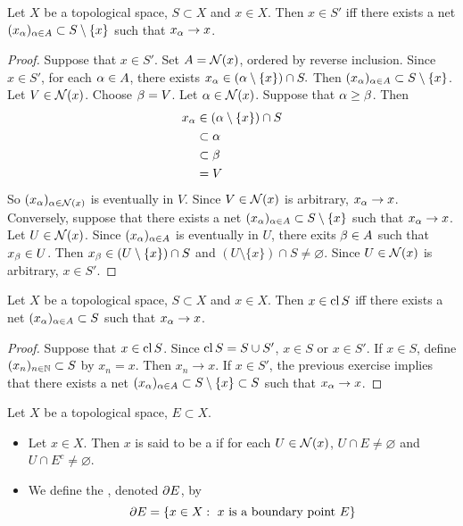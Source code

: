\documentclass{book}
\begin{document}
	\begin{ex} 
	Let $X$ be a topological space, $S \subset X$ and $x \in X$. Then $x \in S'$ iff there exists a net $(x_{\alpha})_{\alpha \in A} \subset S \setminus \{x\}$ such that $x_{\alpha} \rightarrow x$. 
	\end{ex}

	\begin{proof}
	Suppose that $x \in S'$. Set $A = \mathcal{N}(x)$, ordered by reverse inclusion.  Since $x \in S'$, for each $\alpha \in A$, there exists $x_\alpha \in (\alpha \setminus \{x\}) \cap S.$ Then $(x_{\alpha})_{\alpha \in A} \subset S \setminus \{x\}$. Let $V \in \mathcal{N}(x)$. Choose $\beta = V$. Let $\alpha \in \mathcal{N}(x)$. Suppose that $\alpha \geq \beta$. Then 
	\begin{align*}
	x_{\alpha} 
	&\in (\alpha \setminus \{x\}) \cap S \\
	& \subset \alpha \\
	& \subset \beta \\
	&= V
\end{align*}	
	So $(x_{\alpha})_{\alpha \in \mathcal{N}(x)}$ is eventually in $V$. Since $V \in \mathcal{N}(x)$ is arbitrary, $x_{\alpha } \rightarrow x$. \\
	Conversely, suppose that there exists a net $(x_{\alpha})_{\alpha \in A} \subset S \setminus \{x\}$ such that $x_{\alpha} \rightarrow x$. Let $U \in \mathcal{N}(x)$. Since $(x_{\alpha})_{\alpha \in A}$ is eventually in $U$, there exits $\beta \in A$ such that $x_{\beta} \in U$. Then $x_{\beta} \in (U \setminus \{x\}) \cap S$ and $(U \setminus \{x\}) \cap S \neq \varnothing$. Since $U \in \mathcal{N}(x)$ is arbitrary, $x \in S'$.
	\end{proof}
	
	\begin{ex} 
	Let $X$ be a topological space, $S \subset X$ and $x \in X$. Then $x \in \operatorname{cl} S$ iff there exists a net $(x_{\alpha})_{\alpha \in A} \subset S$ such that $x_{\alpha} \rightarrow x$. 
	\end{ex}

	\begin{proof}
	Suppose that $x \in \operatorname{cl} S$. Since $\operatorname{cl} S = S \cup S'$, $x \in S$ or $x \in S'$. If $x \in S$, define $(x_n)_{n \in \mathbb{N}} \subset S$ by $x_n = x$. Then $x_n \rightarrow x$. If $x \in S'$, the previous exercise implies that there exists a net $(x_{\alpha})_{\alpha \in A} \subset S \setminus \{x\} \subset S$ such that $x_{\alpha} \rightarrow x$. 
	\end{proof}

	\begin{defn}
		Let $X$ be a topological space, $E \subset X$.  
		\begin{itemize}
			\item Let $x \in X$. Then $x$ is said to be a  if for each $U \in \mathcal{N}(x)$, $U \cap E \neq \varnothing$ and $U \cap E^c \neq \varnothing$.
			\item We define the , denoted $\partial E$, by 
			$$\partial E = \{x \in X: \text{ $x$ is a boundary point $E$}\}$$
		\end{itemize}
	\end{defn}
	
\end{document}
